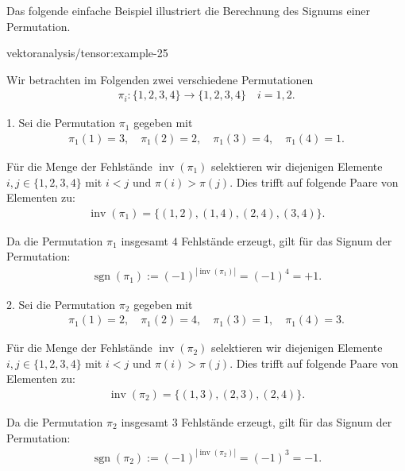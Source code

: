 \documentclass[letterpaper,10pt,english]{jupyterBook}
\begin{document}
\par
Das folgende einfache Beispiel illustriert die Berechnung des Signums einer Permutation.
\begin{example}{}{vektoranalysis/tensor:example-25}



\par
Wir betrachten im Folgenden zwei verschiedene Permutationen
\begin{align*}
\pi_i \colon \lbrace 1, 2, 3, 4 \rbrace \rightarrow \lbrace 1, 2, 3, 4 \rbrace \quad i=1,2.
\end{align*}


\par
1. Sei die Permutation \(\pi_1\) gegeben mit
\begin{align*}
\pi_1(1) = 3, \quad \pi_1(2) = 2, \quad \pi_1(3) = 4, \quad \pi_1(4) = 1.
\end{align*}
\par
Für die Menge der Fehlstände \(\operatorname{inv}(\pi_1)\) selektieren wir diejenigen Elemente \(i,j \in \lbrace 1,2,3,4 \rbrace\) mit \(i < j\) und \(\pi(i) > \pi(j)\).
Dies trifft auf folgende Paare von Elementen zu:
\begin{align*}
\operatorname{inv}(\pi_1) = \lbrace (1,2), (1,4), (2,4), (3,4)\rbrace.
\end{align*}
\par
Da die Permutation \(\pi_1\) insgesamt \(4\) Fehlstände erzeugt, gilt für das Signum der Permutation:
\begin{align*}
\operatorname{sgn}(\pi_1) := (-1)^{|\operatorname{inv}(\pi_1)|} = (-1)^4 = +1.
\end{align*}


\par
2. Sei die Permutation \(\pi_2\) gegeben mit
\begin{align*}
\pi_1(1) = 2, \quad \pi_1(2) = 4, \quad \pi_1(3) = 1, \quad \pi_1(4) = 3.
\end{align*}
\par
Für die Menge der Fehlstände \(\operatorname{inv}(\pi_2)\) selektieren wir diejenigen Elemente \(i,j \in \lbrace 1,2,3,4 \rbrace\) mit \(i < j\) und \(\pi(i) > \pi(j)\).
Dies trifft auf folgende Paare von Elementen zu:
\begin{align*}
\operatorname{inv}(\pi_2) = \lbrace (1,3), (2,3), (2,4)\rbrace.
\end{align*}
\par
Da die Permutation \(\pi_2\) insgesamt \(3\) Fehlstände erzeugt, gilt für das Signum der Permutation:
\begin{align*}
\operatorname{sgn}(\pi_2) := (-1)^{|\operatorname{inv}(\pi_2)|} = (-1)^3 = -1.
\end{align*}\end{example}
\end{document}
